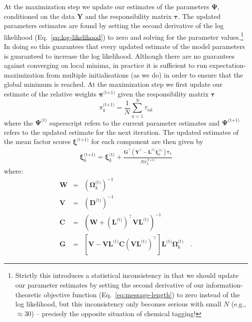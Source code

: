\documentclass[twocolumn]{aastex62}
\newcommand{\vect}[1]{\boldsymbol{\mathbf{#1}}}
\renewcommand{\vec}[1]{\vect{#1}}
\newcommand{\weight}{\pi}
\newcommand{\data}{\textbf{Y}}
\newcommand{\vecdata}{\vec\data}
\newcommand{\nextstep}{^\textrm{(t+1)}}
\newcommand{\thisstep}{^\textrm{(t)}}
\newcommand{\transpose}{^\intercal}
\newcommand{\factorloads}{\textbf{L}}
\newcommand{\specificvariance}{\vec{D}}
\newcommand{\scoremeans}{\vec\xi}
\newcommand{\scorecovs}{\vec\Omega}
\newcommand{\NumData}{N}
\newcommand{\numdata}{n}
\newcommand{\numcomponents}{k}
\begin{document}
At the maximization step we update our estimates of the parameters $\vec\Psi$,
conditioned on the data $\vecdata$ and the responsibility matrix $\vec\tau$.
The updated parameters estimates are found by setting the second derivative
of the log likelihood (Eq.~\ref{eq:log-likelihood}) to zero and solving for
the parameter values.\footnote{Strictly this introduces a statistical inconsistency in that we should update our parameter estimates by setting the second derivative of our information-theoretic objective function (Eq.~\ref{eq:message-length}) to zero instead of the log likelihood, but this inconsistency only becomes serious with small $N$ (e.g., $\approx 30$) -- precisely the opposite situation of chemical tagging!}
In doing so this guarantees that every updated
estimate of the model parameters is guaranteed to increase the log likelihood.
Although there are no guarantees against converging on local minima, in 
practice it is sufficient to run expectation-maximization from multiple
initialisations (as we do) in order to ensure that the global minimum is reached.
At the maximization step we first update our estimate of the relative weights 
$\vec\weight\nextstep$ given the responsibility matrix $\vec\tau$
\begin{equation}
	\weight_\numcomponents\nextstep = \frac{1}{\NumData} \sum_{\numdata=1}^{\NumData}\tau_{\numdata\numcomponents}
\end{equation}
\noindent{}where the $\vec{\Psi}\thisstep$ superscript refers to the current parameter estimates and $\vec{\Psi}\nextstep$ refers to the updated estimate for the next iteration.
The updated estimates of the mean factor scores 
$\scoremeans\nextstep$ for each component are then given by
\begin{eqnarray}
	\scoremeans_\numcomponents\nextstep = \scoremeans_\numcomponents\thisstep + \frac{\vec{G}\transpose(\vecdata\transpose - \factorloads\thisstep\scoremeans_\numcomponents\thisstep)\vec\tau_\numcomponents}{\NumData\weight_\numcomponents\nextstep}
\end{eqnarray}
\noindent{}where:
\begin{eqnarray}
	\vec{W} &=& (\scorecovs_\numcomponents\thisstep)^{-1} \\
	\vec{V} &=& \left(\specificvariance\thisstep\right)^{-1} \\
	\vec{C} &=& (\vec{W} + (\factorloads\thisstep)\transpose\vec{V}\factorloads\thisstep)^{-1} \\
	\vec{G} &=& \left[\vec{V} - \vec{V}\factorloads\thisstep\vec{C}\left(\vec{V}\factorloads\thisstep\right)\transpose\right]\factorloads\thisstep\scorecovs_k\thisstep \quad .
\end{eqnarray}
\end{document}
